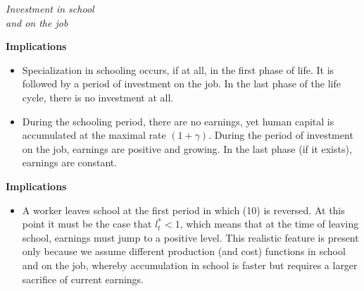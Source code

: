 \begin{frame}\begin{center}
	\LARGE\textit{Investment in school \\ and on the job}
\end{center}\end{frame}
\begin{frame}\textbf{Implications}\vspace{0.3cm}

\begin{itemize}\setlength\itemsep{1em}
\item Specialization in schooling occurs, if at all, in the first phase of life. It is followed by a period of investment on the job. In the last phase of the life cycle, there is no investment at all.
\item During the schooling period, there are no earnings, yet human capital is accumulated at the maximal rate $(1 + \gamma )$. During the period of investment on the job, earnings are positive and growing. In the last phase (if it exists), earnings are constant.
\end{itemize}

\end{frame}
\begin{frame}\textbf{Implications}\vspace{0.3cm}

\begin{itemize}\setlength\itemsep{1em}
\item A worker leaves school at the first period in which (10) is reversed. At this point it must be the case that $l_t^* < 1$, which means that at the time of leaving school, earnings must jump to a positive level. This realistic feature is present only because we assume different production (and cost) functions in school and on the job, whereby accumulation in school is faster but requires a larger sacrifice of current earnings.
\end{itemize}

\end{frame}
